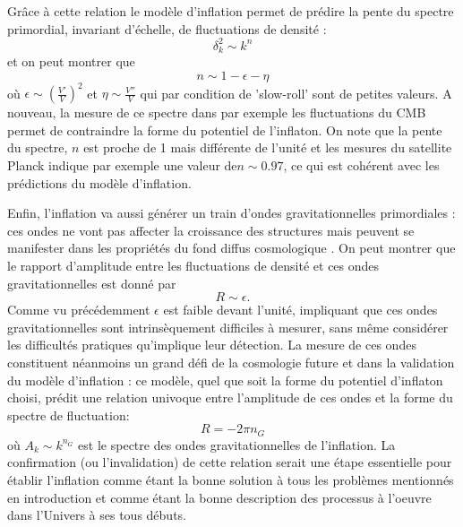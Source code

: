 Grâce à cette relation le modèle d'inflation permet de prédire la pente du spectre primordial, invariant d'échelle, de fluctuations de densité :
\begin{equation}
\delta^2_k\sim k^n
\end{equation}
et on peut montrer que 
\begin{equation}
n\sim 1-\epsilon -\eta
\end{equation}
où $\epsilon\sim (\frac{V'}{V})^2$ et $\eta \sim \frac{V''}{V}$ qui par condition de 'slow-roll' sont de petites valeurs. A nouveau, la mesure de ce spectre dans par exemple les fluctuations du CMB permet de contraindre la forme du potentiel de l'inflaton. On note que la pente du spectre, $n$ est proche de 1 mais différente de l'unité et les mesures du satellite Planck indique par exemple une valeur de$n\sim 0.97$, ce qui est cohérent avec les prédictions du modèle d'inflation.

Enfin, l'inflation va aussi générer un train d'ondes gravitationnelles primordiales : ces ondes ne vont pas affecter la croissance des structures mais peuvent se manifester dans les propriétés du fond diffus cosmologique .
On peut montrer que le rapport d'amplitude entre les fluctuations de densité et ces ondes gravitationnelles est donné par
\begin{equation}
R\sim \epsilon.
\end{equation}
Comme vu précédemment $\epsilon$ est faible devant l'unité, impliquant que ces ondes gravitationnelles sont intrinsèquement difficiles à mesurer, sans même considérer les difficultés pratiques qu'implique leur détection. La mesure de ces ondes constituent néanmoins un grand défi de la cosmologie future et dans la validation du modèle d'inflation : ce modèle, quel que soit la forme du potentiel d'inflaton choisi, prédit une relation univoque entre l'amplitude de ces ondes et la forme du spectre de fluctuation:
\begin{equation}
R=-2\pi n_G
\end{equation}
où $A_k\sim k^{n_G}$ est le spectre des ondes gravitationnelles de l'inflation. La confirmation (ou l'invalidation) de cette relation serait une étape essentielle pour établir l'inflation comme étant la bonne solution à tous les problèmes mentionnés en introduction et comme étant la bonne description des processus à l'oeuvre dans l'Univers à ses tous débuts. 